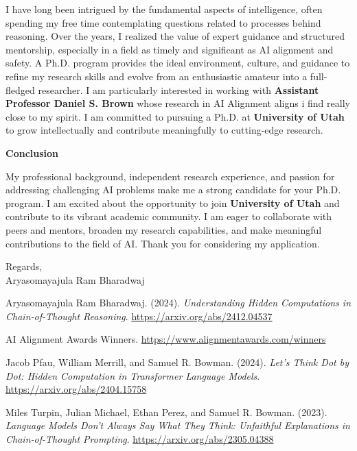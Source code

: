 \documentclass[12pt]{article}
\begin{document}
I have long been intrigued by the fundamental aspects of intelligence, often spending my free time contemplating questions related to  processes behind reasoning. Over the years, I realized the value of expert guidance and structured mentorship, especially in a field as timely and significant as AI alignment and safety. A Ph.D. program provides the ideal environment, culture, and guidance to refine my research skills and evolve from an enthusiastic amateur into a full-fledged researcher. I am particularly interested in working with \textbf{Assistant Professor  Daniel S. Brown } whose research in AI Alignment aligns i find really close to my spirit. I am committed to pursuing a Ph.D. at \textbf{University of Utah} to grow intellectually and contribute meaningfully to cutting-edge research.

\textbf{Conclusion}

My professional background, independent research experience, and passion for addressing challenging AI problems make me a strong candidate for your Ph.D. program. I am excited about the opportunity to join \textbf{University of Utah} and contribute to its vibrant academic community. I am eager to collaborate with peers and mentors, broaden my research capabilities, and make meaningful contributions to the field of AI. Thank you for considering my application.

Regards,\\
Aryasomayajula Ram Bharadwaj

\newpage
\begin{thebibliography}{9}

Aryasomayajula Ram Bharadwaj. (2024). \emph{Understanding Hidden Computations in Chain-of-Thought Reasoning}.  
\url{https://arxiv.org/abs/2412.04537}

AI Alignment Awards Winners.  
\url{https://www.alignmentawards.com/winners}

Jacob Pfau, William Merrill, and Samuel R. Bowman. (2024). \emph{Let's Think Dot by Dot: Hidden Computation in Transformer Language Models}.  
\url{https://arxiv.org/abs/2404.15758}

Miles Turpin, Julian Michael, Ethan Perez, and Samuel R. Bowman. (2023). \emph{Language Models Don't Always Say What They Think: Unfaithful Explanations in Chain-of-Thought Prompting}.  
\url{https://arxiv.org/abs/2305.04388}

\end{thebibliography}
\end{document}

